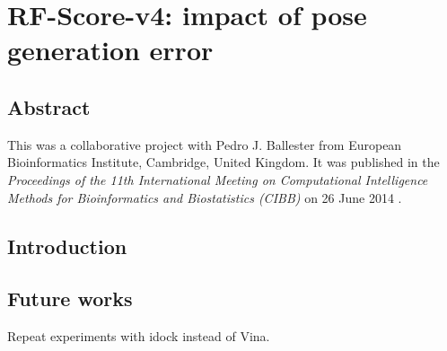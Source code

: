 \chapter{RF-Score-v4: impact of pose generation error}

\section{Abstract}

This was a collaborative project with Pedro J. Ballester from European Bioinformatics Institute, Cambridge, United Kingdom. It was published in the \textit{Proceedings of the 11th International Meeting on Computational Intelligence Methods for Bioinformatics and Biostatistics (CIBB)} on 26 June 2014 \citep{1434}.

\section{Introduction}



\section{Future works}

Repeat experiments with idock instead of Vina.

\chapterend
